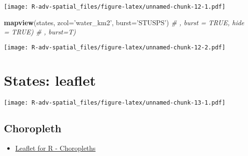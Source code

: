 \documentclass[]{book}
\newenvironment{Shaded}{\begin{snugshade}}{\end{snugshade}}
\newcommand{\KeywordTok}[1]{\textcolor[rgb]{0.13,0.29,0.53}{\textbf{{#1}}}}
\newcommand{\DataTypeTok}[1]{\textcolor[rgb]{0.13,0.29,0.53}{{#1}}}
\newcommand{\StringTok}[1]{\textcolor[rgb]{0.31,0.60,0.02}{{#1}}}
\newcommand{\CommentTok}[1]{\textcolor[rgb]{0.56,0.35,0.01}{\textit{{#1}}}}
\newcommand{\NormalTok}[1]{{#1}}
\providecommand{\tightlist}{%
  \setlength{\itemsep}{0pt}\setlength{\parskip}{0pt}}
\begin{document}
\texttt{[image: R-adv-spatial\_files/figure-latex/unnamed-chunk-12-1.pdf]}

\begin{Shaded}
\begin{Highlighting}[]
\KeywordTok{mapview}\NormalTok{(states, }\DataTypeTok{zcol=}\StringTok{'water_km2'}\NormalTok{, }\DataTypeTok{burst=}\StringTok{'STUSPS'}\NormalTok{) }\CommentTok{# , burst = TRUE, hide = TRUE) # , burst=T)}
\end{Highlighting}
\end{Shaded}

\texttt{[image: R-adv-spatial\_files/figure-latex/unnamed-chunk-12-2.pdf]}

\section{States: leaflet}\label{states-leaflet}

\begin{Shaded}
\end{Shaded}

\texttt{[image: R-adv-spatial\_files/figure-latex/unnamed-chunk-13-1.pdf]}

\subsection{Choropleth}\label{choropleth}

\begin{itemize}
\tightlist
\item
  \href{http://rstudio.github.io/leaflet/choropleths.html}{Leaflet for R
  - Choropleths}
\end{itemize}
\end{document}
